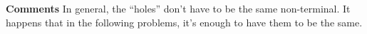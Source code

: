 \documentclass[10pt]{article}
\begin{document}


\textbf{Comments } In general, the ``holes'' don't have to be the same non-terminal. It happens that in the following problems, it's enough to have them to be the same.
\end{document}
